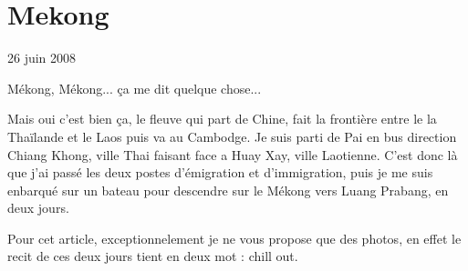 \section{Mekong}

26 juin 2008

\begin{multicols}{2}

Mékong, Mékong... ça me dit quelque chose...

Mais oui c'est bien ça, le fleuve qui part de Chine, fait la frontière entre le la Thaïlande et le Laos puis va au Cambodge. Je suis parti de Pai en bus direction Chiang Khong, ville Thai faisant face a Huay Xay, ville Laotienne. C'est donc là que j'ai passé les deux postes d'émigration et d'immigration, puis je me suis enbarqué sur un bateau pour descendre sur le Mékong vers Luang Prabang, en deux jours.

Pour cet article, exceptionnelement je ne vous propose que des photos, en effet le recit de ces deux jours tient en deux mot : chill out.






\end{multicols}


